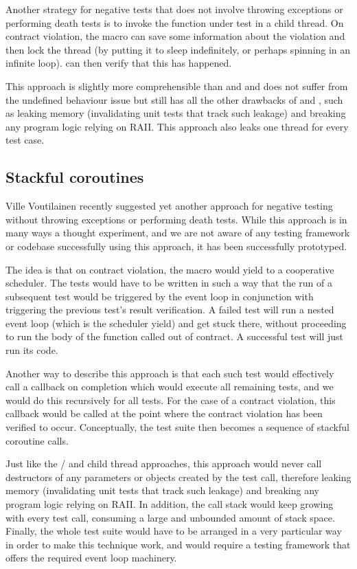 Another strategy for negative tests that does not involve throwing exceptions or performing death tests is to invoke the function under test in a child thread. On contract violation, the  macro can save some information about the violation and then lock the thread (by putting it to sleep indefinitely, or perhaps spinning in an infinite loop).  can then verify that this has happened.

This approach is slightly more comprehensible than  and  and does not suffer from the undefined behaviour issue but still has all the other drawbacks of  and , such as leaking memory (invalidating unit tests that track such leakage) and breaking any program logic relying on RAII. This approach also leaks one thread for every test case.

\subsection{Stackful coroutines}

Ville Voutilainen recently suggested yet another approach for negative testing without throwing exceptions or performing death tests. While this approach is in many ways a thought experiment, and we are not aware of any testing framework or codebase successfully using this approach, it has been successfully prototyped.

The idea is that on contract violation, the  macro would yield to a cooperative scheduler. The tests would have to be written in such a way that the run of a subsequent test would be triggered by the event loop in conjunction with triggering the previous test's result verification. A failed test will run a nested event loop (which is the scheduler yield) and get stuck there, without proceeding to run the body of the function called out of contract. A successful test will just run its code. 

Another way to describe this approach is that each such test would effectively call a callback on completion which would execute all remaining tests, and we would do this recursively for all tests. For the case of a contract violation, this callback would be called at the point where the contract violation has been verified to occur. Conceptually, the test suite then becomes a sequence of stackful coroutine calls.

Just like the / and child thread approaches, this approach would never call destructors of any parameters or objects created by the test call, therefore leaking memory (invalidating unit tests that track such leakage) and breaking any program logic relying on RAII. In addition, the call stack would keep growing with every test call, consuming a large and unbounded amount of stack space. Finally, the whole test suite would have to be arranged in a very particular way in order to make this technique work, and would require a testing framework that offers the required event loop machinery.

